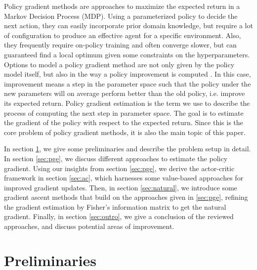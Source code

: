 Policy gradient methods are approaches to maximize the expected return in a Markov Decision Process (MDP). 
Using a parameterized policy to decide the next action, they can easily incorporate prior domain knowledge, but require a lot of configuration to produce an effective agent for a specific environment. 
Also, they frequently require on-policy training and often converge slower, but can guaranteed find a local optimum given some constraints on the hyperparameters. 
Options to model a policy gradient method are not only given by the policy model itself, but also in the way a policy improvement is computed \cite{DBLP:journals/corr/SchulmanMLJA15}. 
In this case, improvement means a step in the parameter space such that the policy under the new parameters will on average perform better than the old policy, i.e. improve its expected return. 
Policy gradient estimation is the term we use to describe the process of computing the next step in parameter space. 
The goal is to estimate the gradient of the policy with respect to the expected return. 
Since this is the core problem of policy gradient methods, it is also the main topic of this paper.

In section \ref{sec:prel}, we give some preliminaries and describe the problem setup in detail. 
In section \ref{sec:pge}, we discuss different approaches to estimate the policy gradient. 
Using our insights from section \ref{sec:pge}, we derive the actor-critic framework in section \ref{sec:ac}, which harnesses some value-based approaches for improved gradient updates. 
Then, in section \ref{sec:natural}, we introduce some gradient ascent methods that build on the approaches given in \ref{sec:pge}, refining the gradient estimation by Fisher's information matrix to get the natural gradient. 
Finally, in section \ref{sec:outro}, we give a conclusion of the reviewed approaches, and discuss potential areas of improvement.

\section{Preliminaries}
\label{sec:prel}


